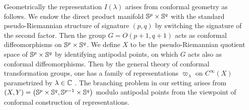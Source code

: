 \documentclass[reqno,12pt]{pja00} %
\newcommand{\assign}{:=}
\newcommand{\tmop}[1]{\ensuremath{\operatorname{#1}}}
\theoremstyle{definition}
\theoremstyle{exampstyle} \newtheorem{examp}[theorem]{Theorem}
\begin{document}
Geometrically the representation $I (\lambda)$ arises from conformal
geometry as follows. We endow the direct product manifold $\mathbb{S}^p\times\mathbb{S}^q$ with the standard pseudo-Riemannian structure of signature $(p,q)$ by switching the signature of the second factor.
Then the group $G=O(p+1,q+1)$ acts as conformal diffeomorphisms on $\mathbb{S}^p\times\mathbb{S}^q$. We define $X$ to be the pseudo-Riemannian quotient space of $\mathbb{S}^p\times\mathbb{S}^q$ by identifying antipodal points,
on which $G$ acts also as conformal diffeomorphisms. Then by the general theory of conformal transformation groups, one has a family of representations $\varpi_\lambda$ on $C^\infty(X)$
parametrized by $\lambda\in\mathbb{C}$ \cite{KO1}. The branching problem in our setting arises from $(X,Y)=\left( \mathbb{S}^p\times\mathbb{S}^q,\mathbb{S}^{p-1}\times\mathbb{S}^q \right)$ modulo antipodal points from the viewpoint
of conformal construction of representations.
\end{document}
